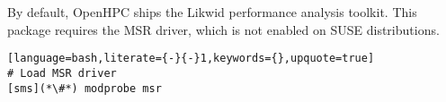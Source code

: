 \begin{center}
\begin{tcolorbox}[]
\small
By default, OpenHPC ships the Likwid performance analysis toolkit. This package 
requires the MSR driver, which is not enabled on SUSE distributions. 
\begin{lstlisting}[language=bash,literate={-}{-}1,keywords={},upquote=true]
# Load MSR driver
[sms](*\#*) modprobe msr
\end{lstlisting}
\end{tcolorbox}
\end{center}


